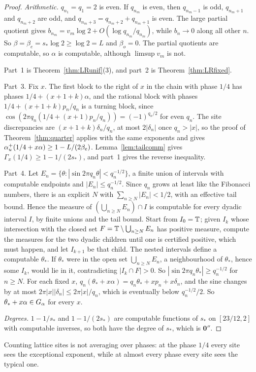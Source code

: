 \begin{proof}
\emph{Arithmetic.} $q_{n_1}=q_1=2$ is even. If $q_{n_m}$ is even, then $q_{n_m-1}$ is odd, $q_{n_m+1}$ and $q_{n_m+2}$ are odd, and $q_{n_m+3}=q_{n_m+2}+q_{n_m+1}$ is even. The large partial quotient gives $b_{n_m}=v_m\log2+O(\log q_{n_m}/q_{n_m})$, while $b_n\to0$ along all other $n$. So $\beta=\beta_e=s_*\log2\ge\log2=L$ and $\beta_o=0$. The partial quotients are computable, so $\alpha$ is computable, although $\limsup v_m$ is not.

Part~1 is Theorem~\ref{thm:LRunif}(3), and part~2 is Theorem~\ref{thm:LRfixed}.

Part~3. Fix $x$. The first block to the right of $x$ in the chain with phase $1/4$ has phases $1/4+(x+1+k)\alpha$, and the rational block with phases $1/4+(x+1+k)p_n/q_n$ is a turning block, since $\cos(2\pi q_n(1/4+(x+1)p_n/q_n))=(-1)^{q_n/2}$ for even $q_n$. The site discrepancies are $(x+1+k)\delta_n/q_n$, at most $2|\delta_n|$ once $q_n>|x|$, so the proof of Theorem~\ref{thm:quarter} applies with the same exponents and gives $\alpha_u^+(1/4+x\alpha)\ge1-L/(2\beta_e)$. Lemma~\ref{lem:tailcomm} gives $\Gamma_x(1/4)\ge1-1/(2s_*)$, and part~1 gives the reverse inequality.

Part~4. Let $E_n=\{\theta:|\sin2\pi q_n\theta|<q_n^{-1/2}\}$, a finite union of intervals with computable endpoints and $|E_n|\le q_n^{-1/2}$. Since $q_n$ grows at least like the Fibonacci numbers, there is an explicit $N$ with $\sum_{n\ge N}|E_n|<1/2$, with an effective tail bound. Hence the measure of $(\bigcup_{n\ge N}E_n)\cap I$ is computable for every dyadic interval $I$, by finite unions and the tail bound. Start from $I_0=\mathbb T$; given $I_k$ whose intersection with the closed set $F=\mathbb T\setminus\bigcup_{n\ge N}E_n$ has positive measure, compute the measures for the two dyadic children until one is certified positive, which must happen, and let $I_{k+1}$ be that child. The nested intervals define a computable $\theta_*$. If $\theta_*$ were in the open set $\bigcup_{n\ge N}E_n$, a neighbourhood of $\theta_*$, hence some $I_k$, would lie in it, contradicting $|I_k\cap F|>0$. So $|\sin2\pi q_n\theta_*|\ge q_n^{-1/2}$ for $n\ge N$. For each fixed $x$, $q_n(\theta_*+x\alpha)=q_n\theta_*+xp_n+x\delta_n$, and the sine changes by at most $2\pi|x||\delta_n|\le2\pi|x|/q_n$, which is eventually below $q_n^{-1/2}/2$. So $\theta_*+x\alpha\in G_\alpha$ for every $x$.

\emph{Degrees.} $1-1/s_*$ and $1-1/(2s_*)$ are computable functions of $s_*$ on $[23/12,2]$ with computable inverses, so both have the degree of $s_*$, which is $\mathbf 0''$.
\end{proof}

Counting lattice sites is not averaging over phases: at the phase $1/4$ every site sees the exceptional exponent, while at almost every phase every site sees the typical one.
